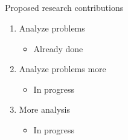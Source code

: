 
\subsection{}

\begin{frame}{Proposed research contributions}
\begin{enumerate}
    \item Analyze problems
    \begin{itemize}
        \item Already done
    \end{itemize}
    \bigskip
    \item Analyze problems more
    \begin{itemize}
        \item In progress
    \end{itemize}
    \bigskip
    \item More analysis
    \begin{itemize}
        \item In progress
    \end{itemize}
\end{enumerate}
\end{frame}


